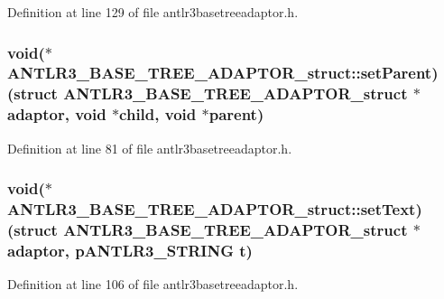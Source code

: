 Definition at line 129 of file antlr3basetreeadaptor.\-h.

\hypertarget{struct_a_n_t_l_r3___b_a_s_e___t_r_e_e___a_d_a_p_t_o_r__struct_af1fea85350899dcfb722478d6de30379}{
\subsubsection[{set\-Parent}]{\setlength{\rightskip}{0pt plus 5cm}void($\ast$ A\-N\-T\-L\-R3\-\_\-\-B\-A\-S\-E\-\_\-\-T\-R\-E\-E\-\_\-\-A\-D\-A\-P\-T\-O\-R\-\_\-struct\-::set\-Parent)(struct {\bf A\-N\-T\-L\-R3\-\_\-\-B\-A\-S\-E\-\_\-\-T\-R\-E\-E\-\_\-\-A\-D\-A\-P\-T\-O\-R\-\_\-struct} $\ast$adaptor, void $\ast$child, void $\ast$parent)}}\label{struct_a_n_t_l_r3___b_a_s_e___t_r_e_e___a_d_a_p_t_o_r__struct_af1fea85350899dcfb722478d6de30379}


Definition at line 81 of file antlr3basetreeadaptor.\-h.

\hypertarget{struct_a_n_t_l_r3___b_a_s_e___t_r_e_e___a_d_a_p_t_o_r__struct_ad6597ca501eb621853499ee9eb5e8f8d}{
\subsubsection[{set\-Text}]{\setlength{\rightskip}{0pt plus 5cm}void($\ast$ A\-N\-T\-L\-R3\-\_\-\-B\-A\-S\-E\-\_\-\-T\-R\-E\-E\-\_\-\-A\-D\-A\-P\-T\-O\-R\-\_\-struct\-::set\-Text)(struct {\bf A\-N\-T\-L\-R3\-\_\-\-B\-A\-S\-E\-\_\-\-T\-R\-E\-E\-\_\-\-A\-D\-A\-P\-T\-O\-R\-\_\-struct} $\ast$adaptor, {\bf p\-A\-N\-T\-L\-R3\-\_\-\-S\-T\-R\-I\-N\-G} {\bf t})}}\label{struct_a_n_t_l_r3___b_a_s_e___t_r_e_e___a_d_a_p_t_o_r__struct_ad6597ca501eb621853499ee9eb5e8f8d}


Definition at line 106 of file antlr3basetreeadaptor.\-h.

